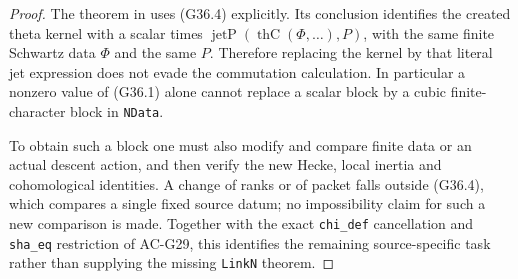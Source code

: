 \begin{proof}
The theorem
in 
uses (G36.4) explicitly.  Its conclusion identifies the
created theta kernel with a scalar times
$\operatorname{jetP}(\operatorname{thC}(\Phi,\ldots),P)$,
with the same finite Schwartz data $\Phi$ and the same $P$.
Therefore replacing the kernel by that literal jet
expression does not evade the commutation calculation.
In particular a nonzero value of (G36.1) alone cannot
replace a scalar block by a cubic finite-character block
in \texttt{NData}.

To obtain such a block one must also modify and compare
finite data or an actual descent action, and then verify
the new Hecke, local inertia and cohomological identities.
A change of ranks or of packet falls outside (G36.4), which
compares a single fixed source datum; no impossibility
claim for such a new comparison is made.
Together with the exact \texttt{chi\_def} cancellation and
\texttt{sha\_eq} restriction of AC-G29, this identifies the
remaining source-specific task rather than supplying the
missing \texttt{LinkN} theorem.
\end{proof}
